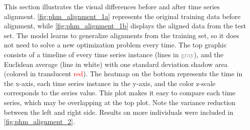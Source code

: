 This section illustrates the visual differences before and after time series alignment. \cref{fig:phm_alignment_1a} represents the original training data before alignment, while \cref{fig:phm_alignment_1b} displays the aligned data from the test set.
The model learns to generalize alignments from the training set, so it does not need to solve a new optimization problem every time. The top graphic consists of a timeline of every time series instance (lines in \textcolor{gray}{gray}), and the Euclidean average (line in white) with one standard deviation shadow area (colored in translucent \textcolor{red}{red}). The heatmap on the bottom represents the time in the x-axis, each time series instance in the y-axis, and the color z-scale corresponds to the series value. This plot makes it easy to compare each time series, which may be overlapping at the top plot. Note the variance reduction between the left and right side. Results on more individuals were included in \cref{fig:phm_alignment_2}.


